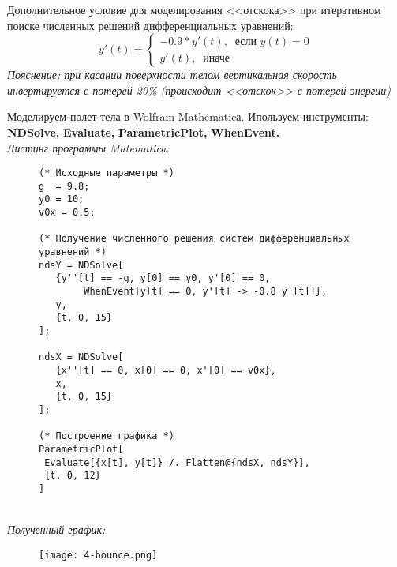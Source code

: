 Дополнительное условие для моделирования <<отскока>>
при итеративном поиске численных решений дифференциальных уравнений:
\begin{equation*}
    y'(t) = 
    \left\{
        \begin{gathered}
            -0.9*y'(t), \;\; \text{если } y(t) = 0\\
            y'(t), \;\; \text{иначе} 
        \end{gathered}
    \right. 
\end{equation*}
\textit{Пояснение: при касании поверхности телом вертикальная скорость инвертируется с потерей 20\% (происходит <<отскок>> с потерей энергии)}

\newpage
Моделируем полет тела в Wolfram Mathematicа. 
Ипользуем инструменты: 
\textbf{NDSolve,} %
\textbf{Evaluate,} %
\textbf{ParametricPlot,} %
\textbf{WhenEvent.}\\[10pt]

\textit{Листинг программы Matematica:}
\begin{figure}[ht]
    \begin{lstlisting}
(* Исходные параметры *)
g  = 9.8;
y0 = 10;
v0x = 0.5;

(* Получение численного решения систем дифференциальных уравнений *)
ndsY = NDSolve[
   {y''[t] == -g, y[0] == y0, y'[0] == 0, 
        WhenEvent[y[t] == 0, y'[t] -> -0.8 y'[t]]},
   y,
   {t, 0, 15}
];

ndsX = NDSolve[
   {x''[t] == 0, x[0] == 0, x'[0] == v0x},
   x,
   {t, 0, 15}
];

(* Построение графика *)
ParametricPlot[
 Evaluate[{x[t], y[t]} /. Flatten@{ndsX, ndsY}], 
 {t, 0, 12}
]
    \end{lstlisting} 
\end{figure}\\[0pt]
\textit{Полученный график:}
\begin{figure}[ht]
\centering
\texttt{[image: 4-bounce.png]}
\end{figure}
